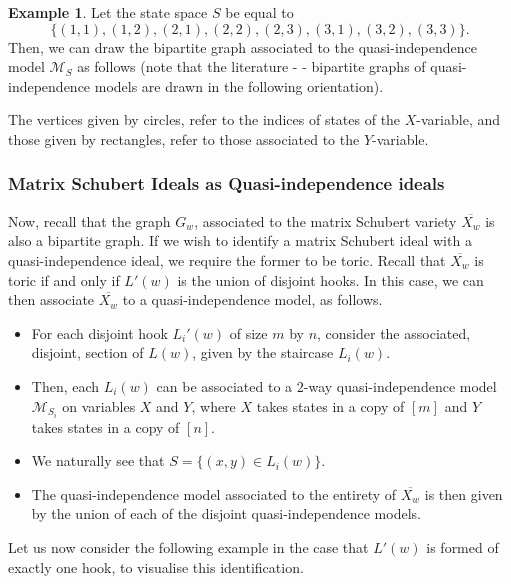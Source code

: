 \documentclass[11pt]{amsart}
\theoremstyle{definition}
\newtheorem{example}[theorem]{Example}
\theoremstyle{definition}
\theoremstyle{definition}
\theoremstyle{definition}
\newcommand{\Xw}{\overline{X_w}}
\begin{document}
\begin{example}\label{eg:q-i model}
Let the state space $S$ be equal to $$\{(1,1),(1,2),(2,1),(2,2),(2,3),(3,1),(3,2),(3,3)\}.$$ Then, we can draw the bipartite graph associated to the quasi-independence model $\mathcal{M}_S$ as follows (note that the literature -  \cite{coons2021quasi} - bipartite graphs of quasi-independence models are drawn in the following orientation).

\begin{center}
\end{center}

\noindent
The vertices given by circles, refer to the indices of states of the $X$-variable, and those given by rectangles, refer to those associated to the $Y$-variable. 




\end{example} 

\subsubsection{Matrix Schubert Ideals as Quasi-independence ideals}
\noindent Now, recall that the graph ${G}_w$, associated to the matrix Schubert variety $\Xw$ is also a bipartite graph. 
If we wish to identify a matrix Schubert ideal with a quasi-independence ideal, we require the former to be toric. Recall that $\overline{X_w}$ is toric if and only if $L'(w)$ is the union of disjoint hooks. In this case, we can then associate $\overline{X_w}$ to a quasi-independence model, as follows. 
\begin{itemize}
    \item For each disjoint hook $L_i'(w)$ of size $m$ by $n$, consider the associated, disjoint, section of $L(w)$, given by the staircase $L_i(w)$.
    \item  Then, each $L_i(w)$ can be associated to a $2$-way quasi-independence model $\mathcal{M}_{S_i}$ on variables $X$ and $Y$, where $X$ takes states in a copy of $[m]$ and $Y$ takes states in a copy of $[n]$.
    \item  We naturally see that $S = \{(x,y)\in L_i(w)\}$.
    \item  The quasi-independence model associated to the entirety of $\overline{X_w}$ is then given by the union of each of the disjoint quasi-independence models. 
\end{itemize}
Let us now consider the following example in the case that $L'(w)$ is formed of exactly one hook, to visualise this identification.
\end{document}
